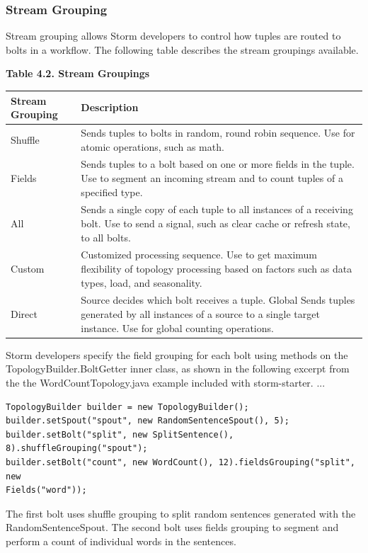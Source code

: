 \documentclass{hcmutarticle}
\begin{document}
\subsubsection{Stream Grouping\\}
Stream grouping allows Storm developers to control how tuples are routed to bolts in a
workflow. The following table describes the stream groupings available.

\textbf{Table 4.2. Stream Groupings}
\begin{center}
	\begin{tabular}{|l| p{12cm} |}
		\hline
		\textbf{Stream Grouping} & \textbf{Description}\\
		\hline
		Shuffle & Sends tuples to bolts in random, round robin sequence. Use for atomic operations, such as math.\\
		\hline
		Fields & Sends tuples to a bolt based on one or more fields in the
tuple. Use to segment an incoming stream and to count
tuples of a specified type.\\
		\hline
		All & Sends a single copy of each tuple to all instances of a
receiving bolt. Use to send a signal, such as clear cache or
refresh state, to all bolts.\\
		\hline
		Custom & Customized processing sequence. Use to get maximum
flexibility of topology processing based on factors such as
data types, load, and seasonality. \\
		\hline
		Direct & Source decides which bolt receives a tuple.
Global Sends tuples generated by all instances of a source to a
single target instance. Use for global counting operations.\\
		\hline
	\end{tabular}
\end{center}
Storm developers specify the field grouping for each bolt using methods on the
TopologyBuilder.BoltGetter inner class, as shown in the following excerpt from the
the WordCountTopology.java example included with storm-starter.
...
\begin{lstlisting}
TopologyBuilder builder = new TopologyBuilder();
builder.setSpout("spout", new RandomSentenceSpout(), 5);
builder.setBolt("split", new SplitSentence(), 8).shuffleGrouping("spout");
builder.setBolt("count", new WordCount(), 12).fieldsGrouping("split", new
Fields("word"));
\end{lstlisting}

The first bolt uses shuffle grouping to split random sentences generated with the
RandomSentenceSpout. The second bolt uses fields grouping to segment and perform a
count of individual words in the sentences.
\end{document}
